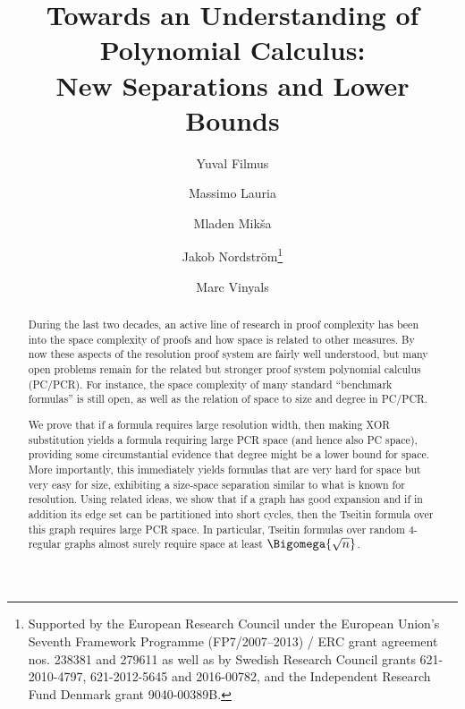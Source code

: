 \documentclass{toc}
\begin{document}
\begin{frontmatter}%

%
%
%

%
%
%

\title{%
  Towards an Understanding of \\ Polynomial Calculus:  \\
  New Separations and Lower Bounds%
  }

%
%
%
%
%
%
%
%
%
%
%
%


%
%
%
%

%

\author[filmus]{Yuval Filmus}
\author[lauria]{Massimo Lauria}
\author[miksa]{Mladen Mik\v{s}a}
\author[nordstrom]{Jakob Nordstr\"{o}m\thanks{Supported by the European Research Council under the European Union’s Seventh Framework Programme (FP7/2007–2013) / ERC grant agreement nos. 238381 and 279611
as well as by Swedish Research Council grants 621-2010-4797, 621-2012-5645 and 2016-00782, and the Independent Research Fund Denmark grant \mbox{9040-00389B}.}}
\author[vinyals]{Marc Vinyals}


%
%
%
%

%
%
%
%
%
%
%
%
%
\begin{abstract}
  During the last two decades, an active line of research in proof
  complexity has been into the space complexity of proofs and how
  space is related to other measures. By now these aspects of
  the resolution proof system
  are fairly well understood, but many open problems remain
  for the related but stronger proof system
  polynomial calculus (PC/PCR).
  For instance, the space complexity of many standard
  ``benchmark formulas'' is still open, as well as the relation of
  space to size and degree in PC/PCR.

  We prove that if a formula requires large resolution width, then
  making XOR substitution yields a formula requiring large 
  PCR space (and hence also PC space),
  providing some circumstantial evidence that degree might be a lower
  bound for space. More importantly, this immediately yields formulas
  that are very hard for space but very easy for size, exhibiting a
  size-space separation similar to what is known for resolution. Using
  related ideas, we show that if a graph has good expansion and if 
  in addition its edge set can be partitioned into short cycles, then the
  Tseitin formula over this graph requires large PCR space. In
  particular, Tseitin formulas over random $4$-regular graphs
  almost surely require space at least $\Bigomega{\sqrt{n}}$.


\end{abstract}
\end{frontmatter}
\end{document}
